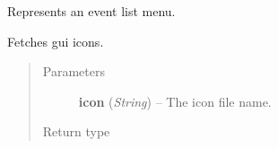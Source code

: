 \documentclass[letterpaper,10pt,english]{sphinxmanual}
\begin{document}

\begin{fulllineitems}
\label{graphicaldesign:graphicaldesign.EventListTemplate}
Represents an event list menu.

\begin{fulllineitems}
\label{graphicaldesign:graphicaldesign.EventListTemplate.GetProgramIcon}
Fetches gui icons.
\begin{quote}\begin{description}
\item[{Parameters}] \leavevmode
\textbf{icon} (\emph{String}) -- The icon file name.

\item[{Return type}] \leavevmode
{}

\end{description}\end{quote}

\end{fulllineitems}


\end{fulllineitems}

\end{document}
